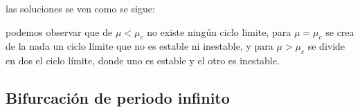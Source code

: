 \begin{ejemplo}
  \begin{figure}[H]
   \centering
  \end{figure}
  las soluciones se ven como se sigue:
  \begin{figure}[H]
   \centering
    \subfloat[$ \mu>\mu_c$]{
      \texttt{[image: gb6]}}
  \end{figure}
  podemos observar que de $ \mu<\mu_c$ no existe ningún ciclo limite, para $\mu=\mu_c$ se crea de la nada un ciclo límite que no es estable ni inestable, y para $ \mu>\mu_c$ se divide en dos el ciclo límite, donde uno es estable y el otro es inestable.  
\end{ejemplo}

\subsection{Bifurcación de periodo infinito}


